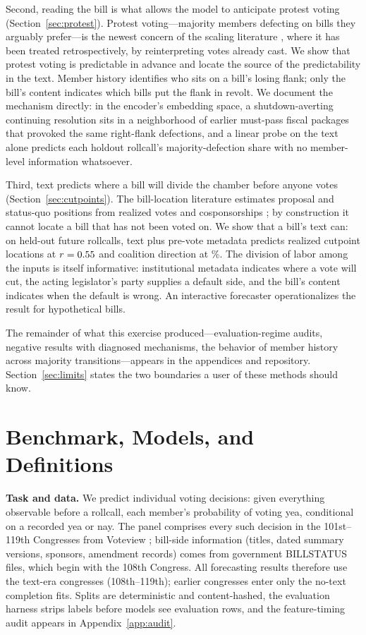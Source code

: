 \documentclass[12pt]{article}
\begin{document}
Second, reading the bill is what allows the model to anticipate
protest voting (Section~\ref{sec:protest}). Protest voting---majority
members defecting on bills they arguably prefer---is the newest
concern of the scaling literature \citep{fowler2026protest,
duckmayr2023ends}, where it has been treated retrospectively, by
reinterpreting votes already cast. We show that protest voting is
predictable in advance and locate the source of the predictability in
the text. Member history identifies who sits on a bill's losing
flank; only the bill's content indicates which bills put the flank in
revolt. We document the mechanism directly: in the encoder's
embedding space, a shutdown-averting continuing resolution sits in a
neighborhood of earlier must-pass fiscal packages that provoked the
same right-flank defections, and a linear probe on the text alone
predicts each holdout rollcall's majority-defection share with no
member-level information whatsoever.

Third, text predicts where a bill will divide the chamber before
anyone votes (Section~\ref{sec:cutpoints}). The bill-location
literature estimates proposal and status-quo positions from realized
votes and cosponsorships \citep{peress2013estimating,
richman2011parties}; by construction it cannot locate a bill that has
not been voted on. We show that a bill's text can: on held-out future
rollcalls, text plus pre-vote metadata predicts realized cutpoint
locations at $r = 0.55$ and coalition direction at \dirCombo\%.
The division of labor among the inputs is itself informative:
institutional metadata indicates where a vote will cut, the acting
legislator's party supplies a default side, and the bill's content
indicates when the default is wrong. An interactive forecaster
operationalizes the result for hypothetical bills.

The remainder of what this exercise produced---evaluation-regime
audits, negative results with diagnosed mechanisms, the behavior of
member history across majority transitions---appears in the
appendices and repository. Section~\ref{sec:limits} states the two
boundaries a user of these methods should know.

\section{Benchmark, Models, and Definitions}
\label{sec:setup}

\textbf{Task and data.} We predict individual voting decisions: given
everything observable before a rollcall, each member's probability of
voting yea, conditional on a recorded yea or nay. The panel comprises
every such decision in the 101st--119th Congresses from Voteview
\citep{lewis2026voteview}; bill-side information (titles, dated
summary versions, sponsors, amendment records) comes from government
BILLSTATUS files, which begin with the 108th Congress. All
forecasting results therefore use the text-era congresses
(108th--119th); earlier congresses enter only the no-text completion
fits. Splits are deterministic and content-hashed, the evaluation
harness strips labels before models see evaluation rows, and the
feature-timing audit appears in Appendix~\ref{app:audit}.
\end{document}
